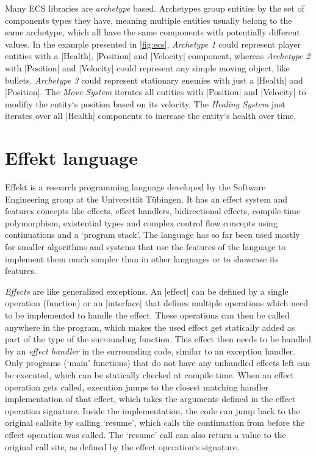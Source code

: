 Many ECS libraries are \textit{archetype} based. Archetypes group entities by the set of components types they have, meaning multiple entities usually belong to the same archetype, which all have the same components with potentially different values. In the example presented in \cref{fig:ecs}, \textit{Archetype 1} could represent player entities with a |Health|, |Position| and |Velocity| component, whereas \textit{Archetype 2} with |Position| and |Velocity| could represent any simple moving object, like bullets. \textit{Archetype 3} could represent stationary enemies with just a |Health| and |Position|. The \textit{Move System} iterates all entities with |Position| and |Velocity| to modifiy the entity`s position based on its velocity. The \textit{Healing System} just iterates over all |Health| components to increase the entity`s health over time.

\section*{Effekt language}

Effekt is a research programming language developed by the Software Engineering group at the Universität Tübingen. It has an effect system and features concepts like effects, effect handlers, bidirectional effects, compile-time polymorphism, existential types and complex control flow concepts using continuations and a `program stack'. The language has so far been used mostly for smaller algorithms and systems that use the features of the language to implement them much simpler than in other languages or to showcase its features.

\textit{Effects} are like generalized exceptions. An |effect| can be defined by a single operation (function) or an |interface| that defines multiple operations which need to be implemented to handle the effect. These operations can then be called anywhere in the program, which makes the used effect get statically added as part of the type of the surrounding function. This effect then needs to be handled by an \textit{effect handler} in the surrounding code, similar to an exception handler. Only programs (`main' functions) that do not have any unhandled effects left can be executed, which can be statically checked at compile time. When an effect operation gets called, execution jumps to the closest matching handler implementation of that effect, which takes the arguments defined in the effect operation signature. Inside the implementation, the code can jump back to the original callsite by calling `resume', which calls the continuation from before the effect operation was called. The `resume' call can also return a value to the original call site, as defined by the effect operation`s signature.

